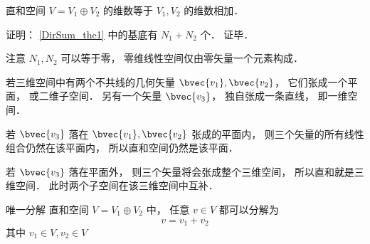 \begin{corollary}{}\label{DirSum_cor1}
直和空间 $V = V_1 \oplus V_2$ 的维数等于 $V_1, V_2$ 的维数相加．
\end{corollary}
证明： \autoref{DirSum_the1} 中的基底有 $N_1 + N_2$ 个． 证毕．

注意 $N_1, N_2$ 可以等于零， 零维线性空间仅由零矢量一个元素构成．

\begin{example}{}\label{DirSum_ex1}
若三维空间中有两个不共线的几何矢量 $\bvec{v_1}, \bvec{v_2}$， 它们张成一个平面， 或二维子空间． 另有一个矢量 $\bvec{v_3}$， 独自张成一条直线， 即一维空间．

若 $\bvec{v_3}$ 落在 $\bvec{v_1}, \bvec{v_2}$ 张成的平面内， 则三个矢量的所有线性组合仍然在该平面内， 所以直和空间仍然是该平面．

若 $\bvec{v_3}$ 落在平面外， 则三个矢量将会张成整个三维空间， 所以直和就是三维空间． 此时两个子空间在该三维空间中互补．
\end{example}


\begin{theorem}{唯一分解}
直和空间 $V = V_1 \oplus V_2$ 中， 任意 $v \in V$ 都可以分解为
\begin{equation}
v = v_1 + v_2
\end{equation}
其中 $v_1 \in V, v_2 \in V$
\end{theorem}
